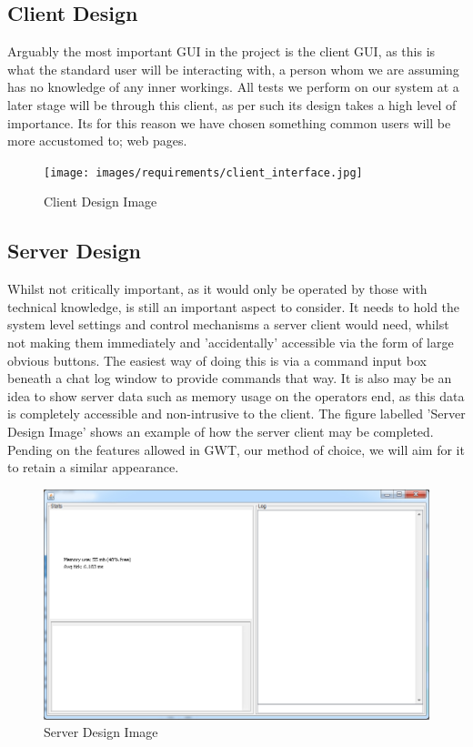 \subsection{Client Design}
Arguably the most important GUI in the project is the client GUI, as this is what
the standard user will be interacting with, a person whom we are assuming has no
knowledge of any inner workings. All tests we perform on our system at a later 
stage will be through this client, as per such its design takes a high level of
importance. Its for this reason we have chosen something common users will be 
more accustomed to; web pages.

\begin{figure}[h]
    \centering
    \texttt{[image: images/requirements/client\_interface.jpg]}
    \caption{Client Design Image}
    \label{fig:client}
\end{figure}

\subsection{Server Design}
Whilst not critically important, as it would only be operated by those with 
technical knowledge, is still an important aspect to consider. It needs to hold 
the system level settings and control mechanisms a server client would need, 
whilst not making them immediately and 'accidentally' accessible via the form of 
large obvious buttons. The easiest way of doing this is via a command input box 
beneath a chat log window to provide commands that way. It is also may be an 
idea to show server data such as memory usage on the operators end, as this data 
is completely accessible and non-intrusive to the client. The figure labelled 
'Server Design Image' shows an example of how the server client may be completed.
Pending on the features allowed in GWT, our method of choice, we will aim for 
it to retain a similar appearance.

\begin{figure}[h]
    \centering
    \includegraphics[width=\textwidth]{images/design/server.jpg}
    \caption{Server Design Image}
    \label{fig:server}
\end{figure}

